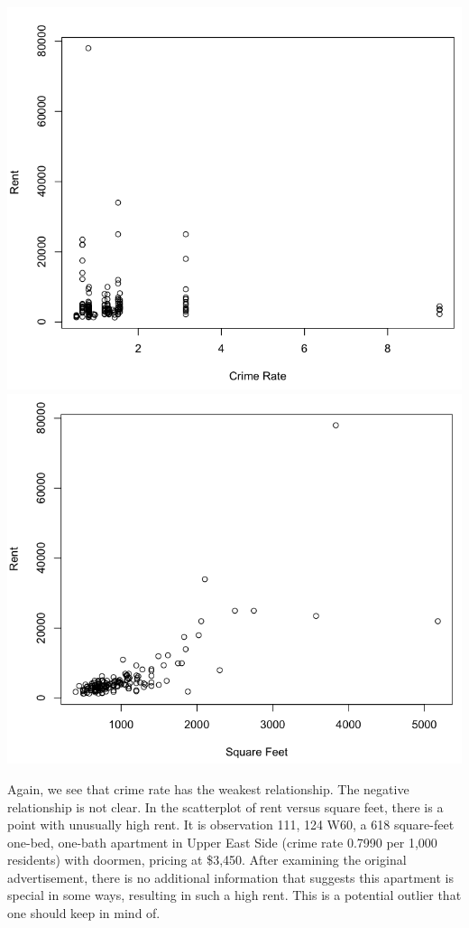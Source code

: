 \documentclass[a4 paper, 11 pt, twocolumn]{article}
\begin{document}
\begin{center}
\includegraphics[scale=0.35]{scatterc}
\includegraphics[scale=0.35]{scatterd}
\end{center}
Again, we see that crime rate has the weakest relationship. The negative relationship is not clear. In the scatterplot of rent versus square feet, there is a point with unusually high rent. It is observation 111, 124 W60, a 618 square-feet one-bed, one-bath apartment in Upper East Side (crime rate 0.7990 per 1,000 residents) with doormen, pricing at \$3,450. After examining the original advertisement, there is no additional information that suggests this apartment is special in some ways, resulting in such a high rent. This is a potential outlier that one should keep in mind of.
\end{document}
